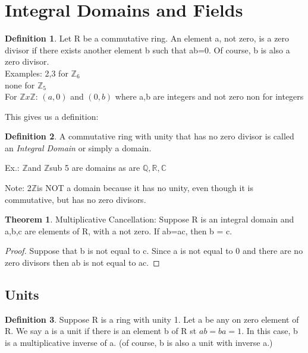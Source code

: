 \documentclass{article}
\newcommand{\Z}{$\mathbb{Z}$}
\theoremstyle{definition}
\newtheorem{definition}{Definition}[section]
\newtheorem{theorem}{Theorem}
\theoremstyle{remark}
\begin{document}
\section{Integral Domains and Fields}
\begin{definition}

Let R be a commutative ring. An element a, not zero, is a zero divisor if there exists another element b such that ab=0. Of course, b is also a zero divisor. \\

Examples: 2,3 for $\mathbb{Z}_6$\\
none for $\mathbb{Z}_5$\\
For $\mathbb{Z}x\mathbb{Z}$: $(a,0)$ and $(0,b)$ where a,b are integers and not zero
non for integers

\end{definition}

This gives us a definition:

\begin{definition}

A commutative ring with unity that has no zero divisor is called an \textit{Integral Domain} or simply a domain.

Ex.: \Z and \Z sub 5 are domains as are $\mathbb{Q}, \mathbb{R}, \mathbb{C}$

\end{definition}

Note: 2\Z is NOT a domain because it has no unity, even though it is commutative, but has no zero divisors.

\begin{theorem}
	Multiplicative Cancellation: Suppose R is an integral domain and a,b,c are elements of R, with a not zero. If ab=ac, then b = c.\\
    \begin{proof}
		Suppose that b is not equal to c. Since a is not equal to 0 and there are no zero divisors then ab is not equal to ac.
	\end{proof}
\end{theorem}

\subsection{Units}
\begin{definition}
Suppose R is a ring with unity 1. Let a be any on zero element of R. We say a is a unit if there is  an element b of R st $ab = ba = 1$. In this case, b is a multiplicative inverse of a. (of course, b is also a unit with inverse a.)
\end{definition}
\end{document}

